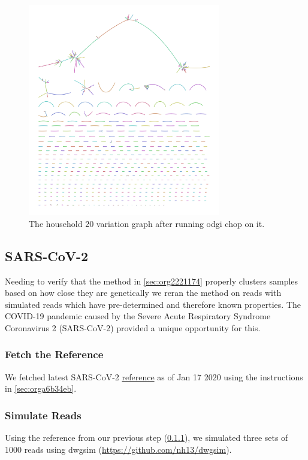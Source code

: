 \documentclass[10pt, a4paper]{article}
\begin{document}
\begin{figure}[h!]
\centering
\includegraphics[width=0.75\textwidth]{../Figures/RSV/Assembly_Bluntified.png}
\caption[RSV Variation Graph]{\label{fig:org4722eb7}
The household 20 variation graph after running odgi chop on it.}
\end{figure}

\clearpage
\subsection{SARS-CoV-2}
\label{sec:orga4c0ebf}
Needing to verify that the method in \ref{sec:org2221174} properly clusters samples based on 
how close they are genetically we reran the method on reads with simulated reads
which have pre-determined and therefore known properties.
The COVID-19 pandemic caused by the Severe Acute Respiratory Syndrome
Coronavirus 2 (SARS-CoV-2) provided a unique opportunity for this. 

\subsubsection{Fetch the Reference}
\label{sec:org79a5d41}
We fetched latest SARS-CoV-2 \href{https://www.ncbi.nlm.nih.gov/nuccore/1798174254}{reference} as of Jan 17 2020 using the instructions
in \ref{sec:orga6b34eb}.

\subsubsection{Simulate Reads}
\label{sec:org451f6da}
Using the reference from our previous step (\ref{sec:org79a5d41}), we simulated 
three sets of 1000 reads using dwgsim (\url{https://github.com/nh13/dwgsim}).
\end{document}
